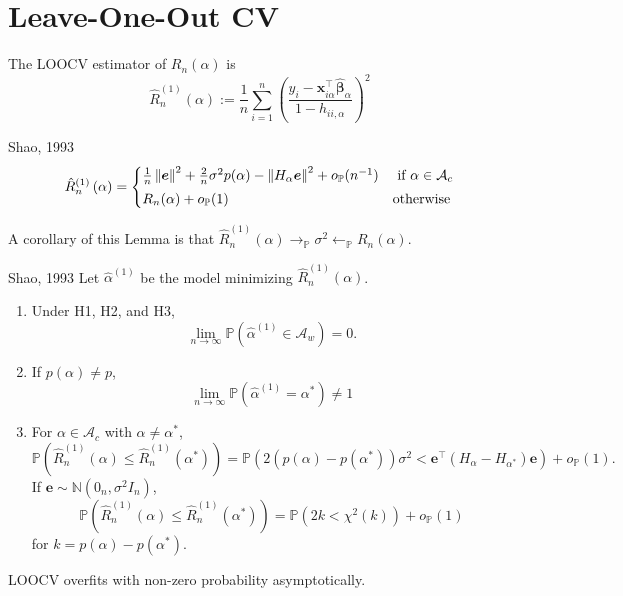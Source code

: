 \documentclass[12pt, letter paper]{article}
\newcommand{\1}{\mathmybb{1}}
\newcommand{\N}{\mathbb{N}}
\newcommand{\0}{\emptyset}
\newcommand{\prob}{\mathbb{P}}
\newcommand{\paren}[1]{\left(#1 \right)}
\newcommand{\norm}[1]{\left|\hspace{-1pt}\left|#1 \right|\hspace{-1pt}\right|}
\newcommand{\normsq}[1]{\norm{#1}^{2}}
\newcommand{\Acal}{\mathcal{A}}
\newcommand{\x}{\boldsymbol{x}}
\newcommand{\e}{\boldsymbol{e}}
\newcommand{\bbetahat}{\boldsymbol{\hat{\beta}}}
\newcommand{\Rhat}[2]{\hat{R}_{n}^{#1}\paren{#2}}
\newcommand{\alphahat}[1]{\hat{\alpha}^{#1}}
\begin{document}
\section{Leave-One-Out CV}
\begin{definition}
    The LOOCV estimator of \(R_{n}(\alpha)\) is 
    \[\Rhat{(1)}{\alpha}:= \frac{1}{n}\sum_{i=1}^{n}\paren{\frac{y_{i}-\x_{i\alpha}^{\top}\bbetahat_{\alpha}}{1-h_{ii,\alpha}}}^{2}\]
\end{definition}

\begin{proposition}[Lemma]{{Shao, 1993}}
    \[\Rhat{(1)}{\alpha} = \begin{cases}
        \frac{1}{n}\normsq{\e} + \frac{2}{n}\sigma^{2}p(\alpha) - \normsq{H_{\alpha}\e} + o_{\prob}(n^{-1}) &\text{ if }\alpha\in\Acal_{c}\\[1mm]
        R_{n}(\alpha) + o_{\prob}(1) &\text{otherwise}
    \end{cases}\]
\end{proposition}

A corollary of this Lemma is that \(\Rhat{(1)}{\alpha}\to_{\prob}\sigma^{2}\leftarrow_{\prob}R_{n}(\alpha)\).

\begin{proposition}{{Shao, 1993}}
    Let \(\alphahat{(1)}\) be the model minimizing \(\Rhat{(1)}{\alpha}\).
    \begin{enumerate}
        \item Under H1, H2, and H3, \[\lim_{n\to\infty}\prob\paren{\alphahat{(1)}\in\Acal_{w}}=0.\]
        \item If \(p(\alpha) \neq p\), \[\lim_{n\to\infty}\prob\paren{\alphahat{(1)}=\alpha^{*}}\neq 1\]
        \item For \(\alpha\in\Acal_{c}\) with \(\alpha\neq\alpha^{*}\),\[\prob\paren{\Rhat{(1)}{\alpha}\leq \Rhat{(1)}{\alpha^{*}}} = \prob\paren{2\paren{p(\alpha) - p(\alpha^{*})}\sigma^{2} < \e^{\top}(H_{\alpha} - H_{\alpha^{*}})\e} + o_{\prob}(1).\] If \(\e\sim\N(0_{n}, \sigma^{2}I_n)\), \[\prob\paren{\Rhat{(1)}{\alpha}\leq \Rhat{(1)}{\alpha^{*}}} = \prob\paren{2k < \chi^{2}(k)} + o_{\prob}(1) \] for \(k=p(\alpha) - p(\alpha^{*})\).
    \end{enumerate}
\end{proposition}

\begin{proposition}[Corollary]{}
    LOOCV overfits with non-zero probability asymptotically.
\end{proposition}
\end{document}
